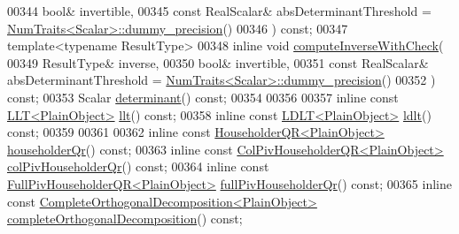 \begin{DoxyCode}
00344       \textcolor{keywordtype}{bool}& invertible,
00345       \textcolor{keyword}{const} RealScalar& absDeterminantThreshold = 
      \hyperlink{group___core___module_struct_eigen_1_1_num_traits}{NumTraits<Scalar>::dummy\_precision}()
00346     ) \textcolor{keyword}{const};
00347     \textcolor{keyword}{template}<\textcolor{keyword}{typename} ResultType>
00348     \textcolor{keyword}{inline} \textcolor{keywordtype}{void} \hyperlink{group___core___module_a116f3b50d2af7dbdf7473e517a5b8b0f}{computeInverseWithCheck}(
00349       ResultType& inverse,
00350       \textcolor{keywordtype}{bool}& invertible,
00351       \textcolor{keyword}{const} RealScalar& absDeterminantThreshold = 
      \hyperlink{group___core___module_struct_eigen_1_1_num_traits}{NumTraits<Scalar>::dummy\_precision}()
00352     ) \textcolor{keyword}{const};
00353     Scalar \hyperlink{group___core___module_a7ad8f77004bb956b603bb43fd2e3c061}{determinant}() \textcolor{keyword}{const};
00354 
00356 
00357     \textcolor{keyword}{inline} \textcolor{keyword}{const} \hyperlink{group___cholesky___module_class_eigen_1_1_l_l_t}{LLT<PlainObject>}  \hyperlink{group___core___module_a90c45f7a30265df792d5aeaddead2635}{llt}() \textcolor{keyword}{const};
00358     \textcolor{keyword}{inline} \textcolor{keyword}{const} \hyperlink{group___cholesky___module_class_eigen_1_1_l_d_l_t}{LDLT<PlainObject>} \hyperlink{group___core___module_a0ecf058a0727a4cab8b42d79e95072e1}{ldlt}() \textcolor{keyword}{const};
00359 
00361 
00362     \textcolor{keyword}{inline} \textcolor{keyword}{const} \hyperlink{group___q_r___module_class_eigen_1_1_householder_q_r}{HouseholderQR<PlainObject>} 
      \hyperlink{group___core___module_a9a9377aab1cea26db5f25bab7e682f8f}{householderQr}() \textcolor{keyword}{const};
00363     \textcolor{keyword}{inline} \textcolor{keyword}{const} \hyperlink{group___q_r___module_class_eigen_1_1_col_piv_householder_q_r}{ColPivHouseholderQR<PlainObject>} 
      \hyperlink{group___core___module_adee8c19c833245bbb00a591dce68e8a4}{colPivHouseholderQr}() \textcolor{keyword}{const};
00364     \textcolor{keyword}{inline} \textcolor{keyword}{const} \hyperlink{group___q_r___module_class_eigen_1_1_full_piv_householder_q_r}{FullPivHouseholderQR<PlainObject>} 
      \hyperlink{group___core___module_a863bc0e06b641a089508eabec6835ab2}{fullPivHouseholderQr}() \textcolor{keyword}{const};
00365     \textcolor{keyword}{inline} \textcolor{keyword}{const} \hyperlink{group___q_r___module_class_eigen_1_1_complete_orthogonal_decomposition}{CompleteOrthogonalDecomposition<PlainObject>} 
      \hyperlink{group___core___module_ae90b6846f05bd30b8d52b66e427e3e09}{completeOrthogonalDecomposition}() \textcolor{keyword}{const};

\end{DoxyCode}
